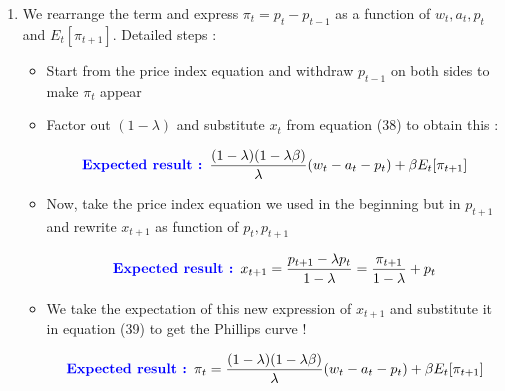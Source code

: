 \documentclass{article}
\begin{document}
\begin{enumerate}
    \item We rearrange the term and express $\pi_t = p_t-p_{t-1}$ as a function of $w_t,a_t,p_t$ and $E_t[\pi_{t+1}]$. Detailed steps : 
    \begin{itemize}
        \item Start from the price index equation and withdraw $p_{t-1}$ on both sides to make $\pi_t$ appear
        \item Factor out $(1-\lambda)$ and substitute $x_t$ from equation (38) to obtain this : 
        \begin{expectedresultsbox}
        \begin{equation}
            \textcolor{blue}{\textbf{Expected result : }} \frac{(1-\lambda)(1-\lambda\beta)}{\lambda}(w_t-a_t-p_t)+\beta E_t[\pi_{t+1}]
        \end{equation}
        \end{expectedresultsbox}
        \item Now, take the price index equation we used in the beginning but in $p_{t+1}$ and rewrite $x_{t+1}$ as function of $p_t, p_{t+1}$
        \begin{expectedresultsbox}
        \begin{equation}
            \textcolor{blue}{\textbf{Expected result : }} x_{t+1}=\frac{p_{t+1}-\lambda p_t}{1-\lambda} = \frac{\pi_{t+1}}{1-\lambda} +p_t
        \end{equation}
        \end{expectedresultsbox}
        \item We take the expectation of this new expression of $x_{t+1}$ and substitute it in equation (39) to get the Phillips curve ! 
        \begin{expectedresultsbox}
        \begin{equation}
            \textcolor{blue}{\textbf{Expected result : }} \pi_t = \frac{(1-\lambda)(1-\lambda\beta)}{\lambda}(w_t-a_t-p_t) + \beta E_t[\pi_{t+1}]
        \end{equation}
        \end{expectedresultsbox}
    \end{itemize}
\end{enumerate}
\end{document}
